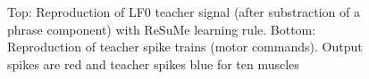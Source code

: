 \documentclass[11pt, a4paper]{article} %
\begin{document}
\begin{figure}
\center
{}
\caption{Top: Reproduction of LF0 teacher signal (after substraction of a phrase component) with ReSuMe learning rule. Bottom: Reproduction of teacher spike trains (motor commands). Output spikes are red and teacher spikes blue for ten muscles}
\label{singleSampleR}
\end{figure}
\end{document}
